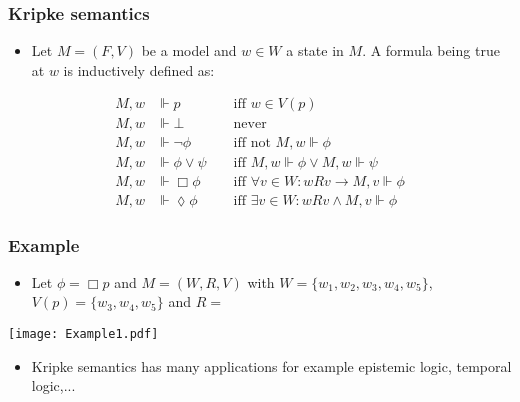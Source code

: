 \documentclass[hyperref={pdfpagelabels=false},t,10pt]{beamer}
\begin{document}
\begin{frame}
  \frametitle{Kripke semantics}
  \begin{itemize}
    \item Let $M = (F,V)$ be a model and $w \in W$ a state in $M$. A formula being true at $w$ is inductively defined as: 
  \end{itemize}

  \begin{align*}
    M, w &\Vdash p &&\text{ iff } w \in V(p) \\
    M, w &\Vdash \bot  &&\text{ never } \\
    M, w &\Vdash \neg \phi &&\text{ iff not } M, w \Vdash \phi \\ 
    M, w &\Vdash \phi \lor \psi &&\text{ iff } M,w \Vdash \phi \lor M,w \Vdash \psi \\
    M, w &\Vdash \Box \phi &&\text{ iff } \forall v \in W : wRv \rightarrow M, v \Vdash \phi \\
    M, w &\Vdash \lozenge \phi &&\text{ iff } \exists v \in W : wRv \land M,v \Vdash \phi
\end{align*}
  
\end{frame}

\begin{frame}
  \frametitle{Example}
  \begin{itemize}
    \item Let $\phi = \Box p$ and $M = (W,R,V)$ with $W = \{w_1,w_2,w_3,w_4,w_5\}$, $V(p) = \{w_3,w_4,w_5\}$ and $R = $
  \end{itemize}
  \centering
  \texttt{[image: Example1.pdf]}
  \pause
  \begin{itemize}
    \item Kripke semantics has many applications for example epistemic logic, temporal logic,...
  \end{itemize}
\end{frame}
\end{document}
